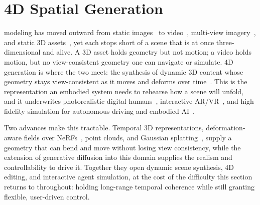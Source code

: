 \section{4D Spatial Generation}
\label{sec:p3_s8_5}




 modeling has moved outward from static images~\cite{rombach2022ldm,saharia2022photorealistic} to video~\cite{chen2024videocrafter2,chen2023videocrafter1,ho2022video,harvey2022flexible}, multi-view imagery~\cite{shi2023mvdream,liu2023zero,shi2023zero123++,zhao2024sg,zhao2024chase}, and static 3D assets~\cite{wang2023score,raj2023dreambooth3d}, yet each stops short of a scene that is at once three-dimensional and alive.
A 3D asset holds geometry but not motion; a video holds motion, but no view-consistent geometry one can navigate or simulate.
4D generation is where the two meet: the synthesis of dynamic 3D content whose geometry stays view-consistent as it moves and deforms over time~\cite{singer2023text,zheng2024unified,jiang2023consistent4d,ling2024align,wang2025moving}.
This is the representation an embodied system needs to rehearse how a scene will unfold, and it underwrites photorealistic digital humans~\cite{guo2023vid2avatar,zhao2024sg,zhao2024chase}, interactive AR/VR~\cite{zhao2024hfgs,miao2024pla4d}, and high-fidelity simulation for autonomous driving and embodied AI~\cite{gao2024magicdrive3d,zhao2024efficient}.

Two advances make this tractable.
Temporal 3D representations, deformation-aware fields over NeRFs~\cite{mildenhall2021nerf}, point clouds, and Gaussian splatting~\cite{kerbl20233d,zhao2024efficient}, supply a geometry that can bend and move without losing view consistency, while the extension of generative diffusion into this domain supplies the realism and controllability to drive it.
Together they open dynamic scene synthesis, 4D editing, and interactive agent simulation, at the cost of the difficulty this section returns to throughout: holding long-range temporal coherence while still granting flexible, user-driven control.


